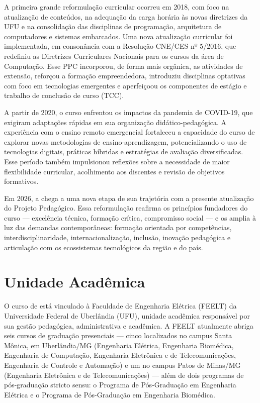 A primeira grande reformulação curricular ocorreu em 2018, com foco na atualização de conteúdos, na adequação da carga horária às novas diretrizes da UFU e na consolidação das disciplinas de programação, arquitetura de computadores e sistemas embarcados. Uma nova atualização curricular foi implementada, em consonância com a Resolução CNE/CES nº 5/2016, que redefiniu as Diretrizes Curriculares Nacionais para os cursos da área de Computação. Esse PPC incorporou, de forma mais orgânica, as atividades de extensão, reforçou a formação empreendedora, introduziu disciplinas optativas com foco em tecnologias emergentes e aperfeiçoou os componentes de estágio e trabalho de conclusão de curso (TCC).

A partir de 2020, o curso enfrentou os impactos da pandemia de COVID-19, que exigiram adaptações rápidas em sua organização didático-pedagógica. A experiência com o ensino remoto emergencial fortaleceu a capacidade do curso de explorar novas metodologias de ensino-aprendizagem, potencializando o uso de tecnologias digitais, práticas híbridas e estratégias de avaliação diversificadas. Esse período também impulsionou reflexões sobre a necessidade de maior flexibilidade curricular, acolhimento aos discentes e revisão de objetivos formativos.

Em 2026, a \ppccurso chega a uma nova etapa de sua trajetória com a presente atualização do Projeto Pedagógico. Essa reformulação reafirma os princípios fundadores do curso — excelência técnica, formação crítica, compromisso social — e os amplia à luz das demandas contemporâneas: formação orientada por competências, interdisciplinaridade, internacionalização, inclusão, inovação pedagógica e articulação com os ecossistemas tecnológicos da região e do país.

\section{Unidade Acadêmica}

O curso de \ppccurso está vinculado à Faculdade de Engenharia Elétrica (FEELT) da Universidade Federal de Uberlândia (UFU), unidade acadêmica responsável por sua gestão pedagógica, administrativa e acadêmica. A FEELT atualmente abriga seis cursos de graduação presenciais — cinco localizados no campus Santa Mônica, em Uberlândia/MG (Engenharia Elétrica, Engenharia Biomédica, Engenharia de Computação, Engenharia Eletrônica e de Telecomunicações, Engenharia de Controle e Automação) e um no campus Patos de Minas/MG (Engenharia Eletrônica e de Telecomunicações) — além de dois programas de pós-graduação stricto sensu: o Programa de Pós-Graduação em Engenharia Elétrica e o Programa de Pós-Graduação em Engenharia Biomédica.

